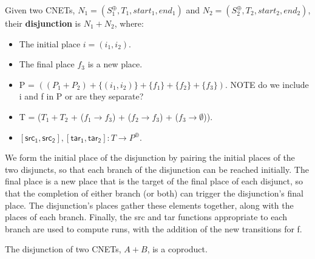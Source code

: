 \begin{definition}
  \label{def:OR-PN}
  Given two CNETs, $N_1= (S_1^\oplus, T_1, start_1, end_1)$ and $N_2= (S_2^\oplus, T_2, start_2, end_2)$, their \textbf{disjunction} is $N_1 + N_2$, where: 
\begin{itemize}
\item The initial place $i = (i_1 , i_2)$.
\item The final place $f_3$ is a new place.
\item P = $((P_1 + P_2) + \{(i_1 , i_2)\} + \{f_1\} + \{f_2\} + \{f_3\}).$ NOTE do we include i and f in P or are they separate?
\item T = ($T_1 + T_2$ + ($f_1 \to f_3$) + ($f_2 \to f_3$) + ($f_3 \to \emptyset$)).
\item $[\mathsf{src_1}, \mathsf{src_2}], [\mathsf{tar_1}, \mathsf{tar_2}]: T\to P^\oplus$. 
\end{itemize}
We form the initial place of the disjunction by pairing the initial places of the two disjuncts, so that each branch of the disjunction can be reached initially. The final place is a new place that is the target of the final place of each disjunct, so that the completion of either branch (or both) can trigger the disjunction's final place. The disjunction's places gather these elements together, along with the places of each branch. Finally, the src and tar functions appropriate to each branch are used to compute runs, with the addition of the new transitions for f.  
\end{definition}
\begin{lemma}
  \label{lemma:OR-coproduct}
  The disjunction of two CNETs, $A + B$, is a coproduct. 
\end{lemma}
